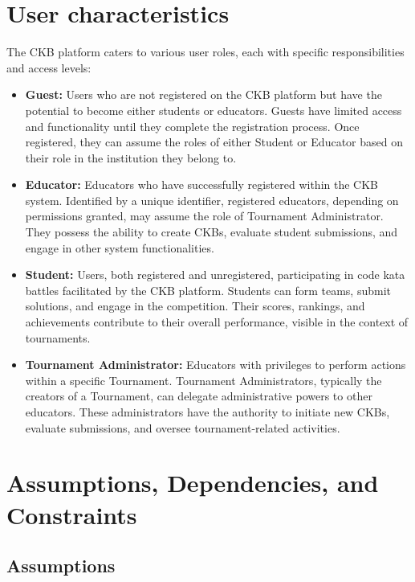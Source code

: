 \section{User characteristics}
\label{sec:user_characteristics}%
The CKB platform caters to various user roles, each with specific responsibilities and access levels:
\begin{itemize}
    \item \textbf{Guest:}  Users who are not registered on the CKB platform but have the potential to become either students or educators. 
    Guests have limited access and functionality until they complete the registration process. 
    Once registered, they can assume the roles of either Student or Educator based on their role in the institution they belong to.
    \item \textbf{Educator:} Educators who have successfully registered within the CKB system. Identified by a unique identifier, registered educators, depending on permissions granted, may assume the role of Tournament Administrator. 
    They possess the ability to create CKBs, evaluate student submissions, and engage in other system functionalities.
    \item \textbf{Student:} Users, both registered and unregistered, participating in code kata battles facilitated by the CKB platform. 
    Students can form teams, submit solutions, and engage in the competition. 
    Their scores, rankings, and achievements contribute to their overall performance, visible in the context of tournaments.
    \item \textbf{Tournament Administrator:} Educators with privileges to perform actions within a specific Tournament. Tournament Administrators, typically the creators of a Tournament, can delegate administrative powers to other educators. 
    These administrators have the authority to initiate new CKBs, evaluate submissions, and oversee tournament-related activities.
\end{itemize}

\section{Assumptions, Dependencies, and Constraints}
\label{subsec:Assumptions, Dependencies, and Constraints}%

\subsection{Assumptions}

